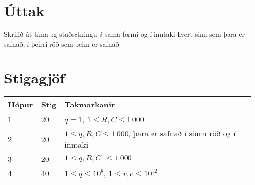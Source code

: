 \section*{Úttak}
Skrifið út tíma og staðsetningu á sama formi og í inntaki hvert sinn sem þara er 
safnað, í þeirri röð sem þeim er safnað. 

\section*{Stigagjöf}
\begin{tabular}{|l|l|l|}
\hline
Hópur & Stig & Takmarkanir \\ \hline
1     & 20   & $q = 1$, $1 \leq R, C \leq 1\,000$ \\ \hline
2     & 20   & $1 \leq q, R, C \leq 1\,000$, þara er safnað í sömu röð og í inntaki \\ \hline
3     & 20   & $1 \leq q, R, C, \leq 1\,000$ \\ \hline
4     & 40   & $1 \leq q \leq 10^5$, $1 \leq r, c \leq 10^{12}$ \\ \hline
\end{tabular}

